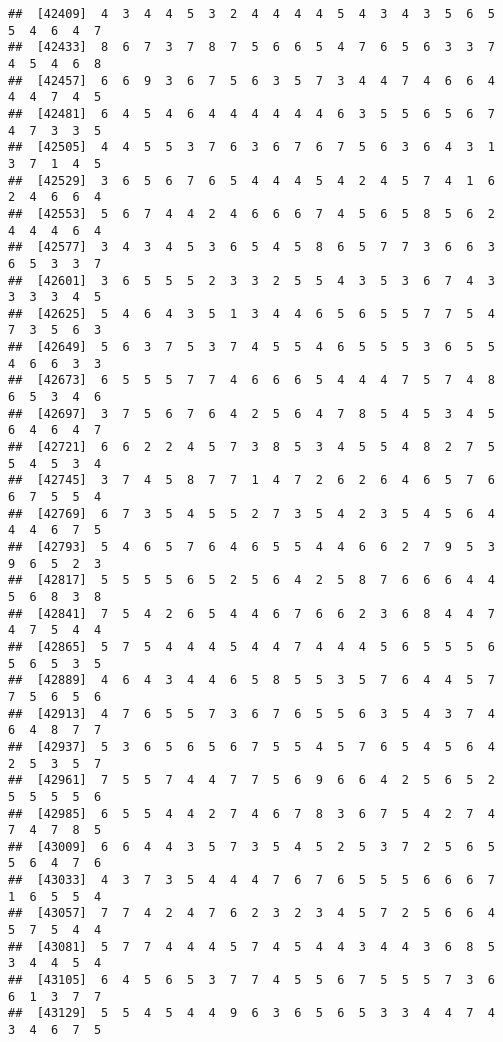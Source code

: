 \documentclass[
]{book}
\begin{document}
\begin{verbatim}
##  [42409]  4  3  4  4  5  3  2  4  4  4  4  5  4  3  4  3  5  6  5  5  4  6  4  7
##  [42433]  8  6  7  3  7  8  7  5  6  6  5  4  7  6  5  6  3  3  7  4  5  4  6  8
##  [42457]  6  6  9  3  6  7  5  6  3  5  7  3  4  4  7  4  6  6  4  4  4  7  4  5
##  [42481]  6  4  5  4  6  4  4  4  4  4  4  6  3  5  5  6  5  6  7  4  7  3  3  5
##  [42505]  4  4  5  5  3  7  6  3  6  7  6  7  5  6  3  6  4  3  1  3  7  1  4  5
##  [42529]  3  6  5  6  7  6  5  4  4  4  5  4  2  4  5  7  4  1  6  2  4  6  6  4
##  [42553]  5  6  7  4  4  2  4  6  6  6  7  4  5  6  5  8  5  6  2  4  4  4  6  4
##  [42577]  3  4  3  4  5  3  6  5  4  5  8  6  5  7  7  3  6  6  3  6  5  3  3  7
##  [42601]  3  6  5  5  5  2  3  3  2  5  5  4  3  5  3  6  7  4  3  3  3  3  4  5
##  [42625]  5  4  6  4  3  5  1  3  4  4  6  5  6  5  5  7  7  5  4  7  3  5  6  3
##  [42649]  5  6  3  7  5  3  7  4  5  5  4  6  5  5  5  3  6  5  5  4  6  6  3  3
##  [42673]  6  5  5  5  7  7  4  6  6  6  5  4  4  4  7  5  7  4  8  6  5  3  4  6
##  [42697]  3  7  5  6  7  6  4  2  5  6  4  7  8  5  4  5  3  4  5  6  4  6  4  7
##  [42721]  6  6  2  2  4  5  7  3  8  5  3  4  5  5  4  8  2  7  5  5  4  5  3  4
##  [42745]  3  7  4  5  8  7  7  1  4  7  2  6  2  6  4  6  5  7  6  6  7  5  5  4
##  [42769]  6  7  3  5  4  5  5  2  7  3  5  4  2  3  5  4  5  6  4  4  4  6  7  5
##  [42793]  5  4  6  5  7  6  4  6  5  5  4  4  6  6  2  7  9  5  3  9  6  5  2  3
##  [42817]  5  5  5  5  6  5  2  5  6  4  2  5  8  7  6  6  6  4  4  5  6  8  3  8
##  [42841]  7  5  4  2  6  5  4  4  6  7  6  6  2  3  6  8  4  4  7  4  7  5  4  4
##  [42865]  5  7  5  4  4  4  5  4  4  7  4  4  4  5  6  5  5  5  6  5  6  5  3  5
##  [42889]  4  6  4  3  4  4  6  5  8  5  5  3  5  7  6  4  4  5  7  7  5  6  5  6
##  [42913]  4  7  6  5  5  7  3  6  7  6  5  5  6  3  5  4  3  7  4  6  4  8  7  7
##  [42937]  5  3  6  5  6  5  6  7  5  5  4  5  7  6  5  4  5  6  4  2  5  3  5  7
##  [42961]  7  5  5  7  4  4  7  7  5  6  9  6  6  4  2  5  6  5  2  5  5  5  5  6
##  [42985]  6  5  5  4  4  2  7  4  6  7  8  3  6  7  5  4  2  7  4  7  4  7  8  5
##  [43009]  6  6  4  4  3  5  7  3  5  4  5  2  5  3  7  2  5  6  5  5  6  4  7  6
##  [43033]  4  3  7  3  5  4  4  4  7  6  7  6  5  5  5  6  6  6  7  1  6  5  5  4
##  [43057]  7  7  4  2  4  7  6  2  3  2  3  4  5  7  2  5  6  6  4  5  7  5  4  4
##  [43081]  5  7  7  4  4  4  5  7  4  5  4  4  3  4  4  3  6  8  5  3  4  4  5  4
##  [43105]  6  4  5  6  5  3  7  7  4  5  5  6  7  5  5  5  7  3  6  6  1  3  7  7
##  [43129]  5  5  4  5  4  4  9  6  3  6  5  6  5  3  3  4  4  7  4  3  4  6  7  5

\end{verbatim}
\end{document}
